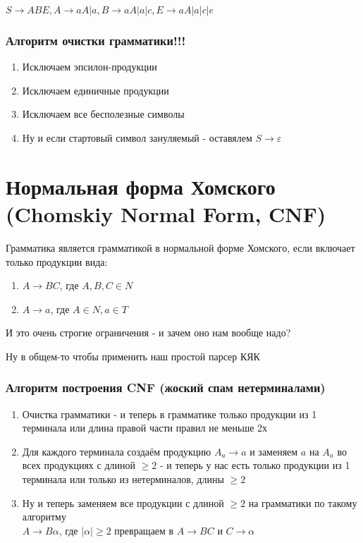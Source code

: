 \documentclass{article}
\begin{document}
$ S \to ABE, A \to aA | a, B \to aA | a | c, E \to aA | a|c |e $



\section{Алгоритм очистки грамматики!!!}
\begin{enumerate}
\item Исключаем эпсилон-продукции
\item Исключаем единичные продукции
\item Исключаем все бесполезные символы
\item Ну и если стартовый символ зануляемый - оставялем $ S \to \varepsilon $

\end{enumerate}
\part{Нормальная форма Хомского (Chomskiy Normal Form, CNF)}
Грамматика является грамматикой в нормальной форме Хомского, если включает только продукции вида:
\begin{enumerate}
\item $ A \to BC $, где $ A, B, C \in N $
\item $ A \to a $, где $ A \in N, a \in T $
\end{enumerate}

И это очень строгие ограничения - и зачем оно нам вообще надо?

Ну в общем-то чтобы применить наш простой парсер КЯК

\section{Алгоритм построения CNF (жоский спам нетерминалами)}
\begin{enumerate}
  \item Очистка грамматики -  и теперь в грамматике только продукции из 1 терминала или длина правой части правил не меньше 2х
    \item Для каждого терминала создаём продукцию $ A_a \to a $ и заменяем $ a $ на $ A_a $ во всех продукциях с длиной $ \ge 2 $ - 
          и теперь у нас есть только продукции из 1 терминала или только из нетерминалов, длины $ \ge 2 $
     \item Ну и теперь заменяем все продукции с длиной $ \ge 2 $ на грамматики по такому алгоритму\\
      $ A \to B\alpha $, где $ |\alpha| \ge 2 $ превращаем в $ A \to BC$ и $C \to \alpha $
\end{enumerate}
\end{document}
